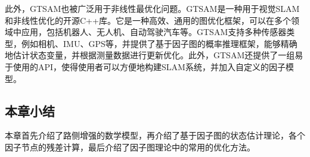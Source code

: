 此外，GTSAM\cite{dellaert2012factor}也被广泛用于非线性最优化问题。GTSAM是一种用于视觉SLAM和非线性优化的开源C++库。它是一种高效、通用的图优化框架，可以在多个领域中应用，包括机器人、无人机、自动驾驶汽车等。GTSAM支持多种传感器类型，例如相机、IMU、GPS等，并提供了基于因子图的概率推理框架，能够精确地估计状态变量，并根据测量数据进行更新优化。此外，GTSAM还提供了一组易于使用的API，使得使用者可以方便地构建SLAM系统，并加入自定义的因子模型。

\subsection{本章小结}
本章首先介绍了路侧增强的数学模型，再介绍了基于因子图的状态估计理论，各个因子节点的残差计算，最后介绍了因子图理论中的常用的优化方法。